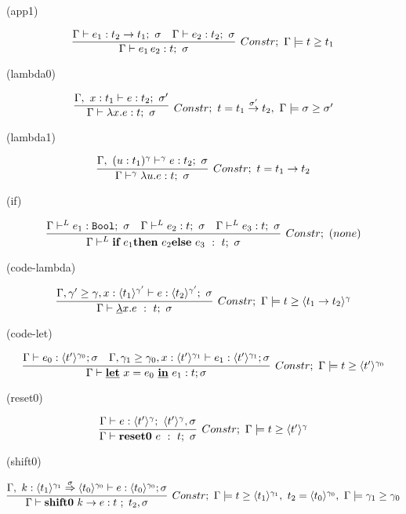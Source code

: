 (app1)

\[
  \infer[Constr;~\Gamma \models \longer{t}{t_1}]
  {\Gamma \vdash e_1 \, e_2 : t;~\sigma}
  {\Gamma \vdash e_1 : t_2 \to t_1;~\sigma
    &\Gamma \vdash e_2 : t_2;~\sigma
  }
\]

(lambda0)

\[
  \infer[Constr;~t=\funT{t_1}{t_2}{\sigma'},~ \Gamma \models \sigma \ord \sigma' ]
  {\Gamma \vdash \lambda x.e : t;~\sigma}
  {\Gamma,~x:t_1 \vdash e : t_2;~\sigma'}
\]

(lambda1)

\[
  \infer[Constr;~t=\funT{t_1}{t_2}{}]
  {\Gamma \vdash^\gamma \lambda u.e : t;~\sigma}
  {\Gamma,~(u:t_1)^\gamma \vdash^\gamma e : t_2;~\sigma}
\]

(if)

\[
  \infer[Constr;~(none)]
  {\Gamma \vdash^L
    \textbf{if}~e_1 \textbf{then}~e_2 \textbf{else}~e_3 ~:~t; ~ \sigma}
  {\Gamma \vdash^L e_1 : \Bool;~\sigma
    &\Gamma \vdash^L e_2 : t;~\sigma
    &\Gamma \vdash^L e_3 : t;~\sigma
  }
\]

(code-lambda)

\[
  \infer[Constr;~\Gamma \models \longer{t}{\codeT{t_1 \to t_2}{\gamma}}]
  {\Gamma \vdash \underline{\lambda}x.e ~:~t;~\sigma}
  {\Gamma,\longer{\gamma'}{\gamma},x:\codeT{t_1}{\gamma'}
    \vdash e : \codeT{t_2}{\gamma'};~\sigma
  }
\]

(code-let)

\[
  \infer[Constr;~\Gamma \models \longer{t}{\codeT{t'}{\gamma_0}}]
  {\Gamma \vdash \cLet~ x = e_0~ \cIn~ e_1 : t ; \sigma}
  { \Gamma \vdash e_0 : \codeT{t'}{\gamma_0} ; \sigma
    &\Gamma, \longer{\gamma_1}{\gamma_0}, x: \codeT{t'}{\gamma_1} \vdash e_1 : \codeT{t'}{\gamma_1} ; \sigma
  }
\]

(reset0)

\[
  \infer[Constr;~\Gamma \models \longer{t}{\codeT{t'}{\gamma}}]
  {\Gamma \vdash \Resetz~e ~:~ t; ~\sigma}
  {\Gamma \vdash e:\codeT{t'}{\gamma};~\codeT{t'}{\gamma},\sigma
  }
\]

(shift0)

\[
  \infer[Constr;~\Gamma \models \longer{t}{\codeT{t_1}{\gamma_1}},~ t_2 =\codeT{t_0}{\gamma_0},~ \Gamma \models \longer{\gamma_1}{\gamma_0}]
  {\Gamma \vdash \shiftz{k}{e} : t~;~ t_2,\sigma}
  {\Gamma,~k:\contT{\codeT{t_1}{\gamma_1}}{\codeT{t_0}{\gamma_0}}{\sigma}
    \vdash e : \codeT{t_0}{\gamma_0} ; \sigma
  }
\]


